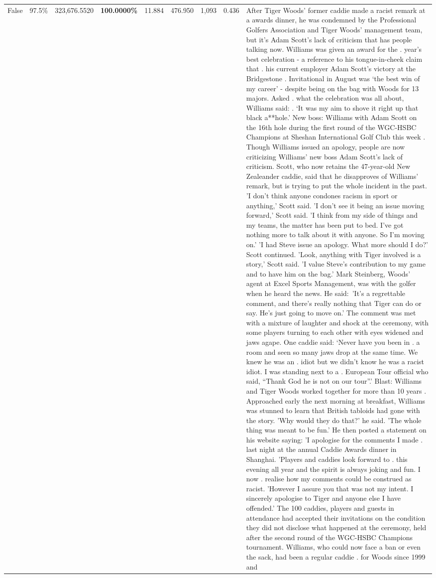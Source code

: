 \begin{table}[H]
\begin{tabular}{lllrlllll}
False & 97.5\% & 323,676.5520 & \bfseries \color{red} 100.0000\% & 11.884 & 476.950 & 1,093 & 0.436 & After Tiger Woods' former caddie made a racist remark at a awards dinner, he was condemned by the Professional Golfers Association and Tiger Woods' management team, but it's Adam Scott's lack of criticism that has people talking now. Williams was given an award for the . year’s best celebration - a reference to his tongue-in-cheek claim that . his current employer Adam Scott’s victory at the Bridgestone . Invitational in August was ‘the best win of my career’ - despite being on the bag with Woods for 13 majors. Asked . what the celebration was all about, Williams said: . ‘It was my aim to shove it right up that black a**hole.’ New boss: Williams with Adam Scott  on the 16th hole during the first round of the WGC-HSBC Champions at Sheshan International Golf Club this week . Though Williams issued an apology, people are now criticizing Williams' new boss Adam Scott's lack of criticism. Scott, who now retains the 47-year-old New Zealeander caddie, said that he disapproves of Williams' remark, but is trying to put the whole incident in the past. 'I don't think anyone condones racism in sport or anything,' Scott said. 'I don't see it being an issue moving forward,' Scott said. 'I think from my side of things and my teams, the matter has been put to bed. I've got nothing more to talk about it with anyone. So I'm moving on.' 'I had Steve issue an apology. What more should I do?' Scott continued. 'Look, anything with Tiger involved is a story,' Scott said. 'I value Steve's contribution to my game and to have him on the bag.' Mark Steinberg, Woods' agent at Excel Sports Management, was with the golfer when he heard the news. He said: 'It's a regrettable comment, and there's really nothing that Tiger can do or say. He's just going to move on.' The comment was met with a mixture of laughter and shock at the ceremony, with some players turning to each other with eyes widened and jaws agape. One caddie said: ‘Never have you been in . a room and seen so many jaws drop at the same time. We knew he was an . idiot but we didn’t know he was a racist idiot. I was standing next to a . European Tour official who said, “Thank God he is not on our tour”.’ Blast: Williams and Tiger Woods worked together for more than 10 years . Approached early the next morning at breakfast, Williams was stunned to learn that British tabloids had gone with the story. 'Why would they do that?' he said. 'The whole thing was meant to be fun.' He then posted a statement on his website saying: 'I apologise for the comments I made . last night at the annual Caddie Awards dinner in Shanghai. 'Players and caddies look forward to . this evening all year and the spirit is always joking and fun. I now . realise how my comments could be construed as racist. 'However I assure you that was not my intent. I sincerely apologise to Tiger and anyone else I have offended.' The 100 caddies, players and guests in attendance had accepted their invitations on the condition they did not disclose what happened at the ceremony, held after the second round of the WGC-HSBC Champions tournament. Williams, who could now face a ban or even the sack, had been a regular caddie . for Woods since 1999 and 
\end{tabular}
\end{table}
